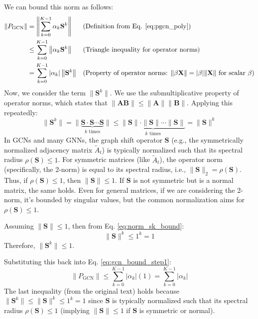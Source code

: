 We can bound this norm as follows:
\begin{align}
    \|P_{\mathrm{GCN}}\| &= \left\| \sum_{k=0}^{K-1} \alpha_k \mathbf{S}^k \right\| && \text{(Definition from Eq. \ref{eq:pgcn_poly})} \nonumber \\
    &\le \sum_{k=0}^{K-1} \left\| \alpha_k \mathbf{S}^k \right\| && \text{(Triangle inequality for operator norms)} \nonumber \\
    &= \sum_{k=0}^{K-1} |\alpha_k| \left\| \mathbf{S}^k \right\| && \text{(Property of operator norms: } \|\beta \mathbf{X}\| = |\beta| \|\mathbf{X}\| \text{ for scalar } \beta \text{)} \label{eq:gcn_bound_step1}
\end{align}
Now, we consider the term $\|\mathbf{S}^k\|$. We use the submultiplicative property of operator norms, which states that $\|\mathbf{A}\mathbf{B}\| \le \|\mathbf{A}\|\|\mathbf{B}\|$. Applying this repeatedly:
\begin{equation}
    \|\mathbf{S}^k\| = \|\underbrace{\mathbf{S} \cdot \mathbf{S} \cdots \mathbf{S}}_{k \text{ times}}\| \le \underbrace{\|\mathbf{S}\| \cdot \|\mathbf{S}\| \cdots \|\mathbf{S}\|}_{k \text{ times}} = \|\mathbf{S}\|^k
    \label{eq:norm_sk_bound}
\end{equation}
In GCNs and many GNNs, the graph shift operator $\mathbf{S}$ (e.g., the symmetrically normalized adjacency matrix $\tilde{A}_t$) is typically normalized such that its spectral radius $\rho(\mathbf{S}) \le 1$. For symmetric matrices (like $\tilde{A}_t$), the operator norm (specifically, the 2-norm) is equal to its spectral radius, i.e., $\|\mathbf{S}\|_2 = \rho(\mathbf{S})$. Thus, if $\rho(\mathbf{S}) \le 1$, then $\|\mathbf{S}\| \le 1$. If $\mathbf{S}$ is not symmetric but is a normal matrix, the same holds. Even for general matrices, if we are considering the 2-norm, it's bounded by singular values, but the common normalization aims for $\rho(\mathbf{S}) \le 1$.

Assuming $\|\mathbf{S}\| \le 1$, then from Eq. \ref{eq:norm_sk_bound}:
\begin{equation}
    \|\mathbf{S}\|^k \le 1^k = 1
    \label{eq:norm_s_power_one}
\end{equation}
Therefore, $\|\mathbf{S}^k\| \le 1$.

Substituting this back into Eq. \ref{eq:gcn_bound_step1}:
\begin{equation}
    \|P_{\mathrm{GCN}}\| \le \sum_{k=0}^{K-1} |\alpha_k| (1) = \sum_{k=0}^{K-1} |\alpha_k|
    \label{eq:pgcn_final_bound}
\end{equation}
The last inequality (from the original text) holds because $\|\mathbf{S}^k\| \le \|\mathbf{S}\|^k \le 1^k = 1$ since $\mathbf{S}$ is typically normalized such that its spectral radius $\rho(\mathbf{S}) \le 1$ (implying $\|\mathbf{S}\| \le 1$ if $\mathbf{S}$ is symmetric or normal).

